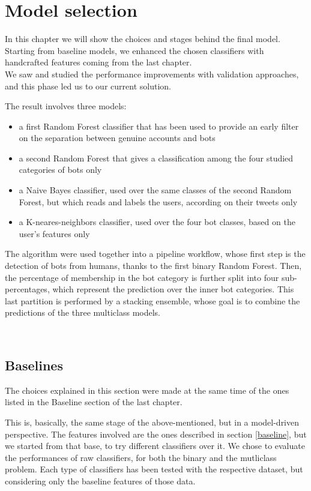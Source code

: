 \chapter{Model selection}
\label{capitolo5}
\thispagestyle{empty}

In this chapter we will show the choices and stages behind the final model.
Starting from baseline models, we enhanced the chosen classifiers with handcrafted features coming from the last chapter.\\
We saw and studied the performance improvements with validation approaches, and this phase led us to our current solution.

The result involves three models:
\begin{itemize}
	\item[\PencilRight] a first Random Forest classifier that has been used to provide an early filter on the separation between genuine accounts and bots
	\item[\PencilRight] a second Random Forest that gives a classification among the four studied categories of bots only
	\item[\PencilRight] a Naive Bayes classifier, used over the same classes of the second Random Forest, but which reads and labels the users, according on their tweets only
	\item[\PencilRight] a K-neares-neighbors classifier, used over the four bot classes, based on the user's features only
\end{itemize}
The algorithm were used together into a pipeline workflow, whose first step is the detection of bots from humans, thanks to the first binary Random Forest.
Then, the percentage of membership in the bot category is further split into four sub-percentages, which represent the prediction over the inner bot categories.
This last partition is performed by a stacking ensemble, whose goal is to combine the predictions of the three multiclass models.

\
\section{Baselines}
The choices explained in this section were made at the same time of the ones listed in the Baseline section of the last chapter.

This is, basically, the same stage of the above-mentioned, but in a model-driven perspective.
The features involved are the ones described in section \ref{baseline}, but we started from that base, to try different classifiers over it.
We chose to evaluate the performances of raw classifiers, for both the binary and the mutliclass problem.
Each type of classifiers has been tested with the respective dataset, but considering only the baseline features of those data.

